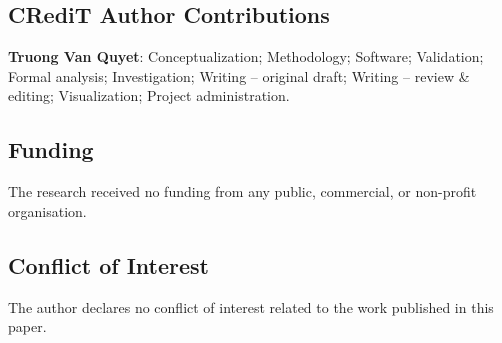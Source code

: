 \subsection*{CRediT Author Contributions}

\textbf{Truong Van Quyet}: Conceptualization; Methodology; Software;
Validation; Formal analysis; Investigation; Writing -- original draft;
Writing -- review \& editing; Visualization; Project administration.

\subsection*{Funding}

The research received no funding from any public, commercial, or non-profit
organisation.

\subsection*{Conflict of Interest}

The author declares no conflict of interest related to the work published in
this paper.

